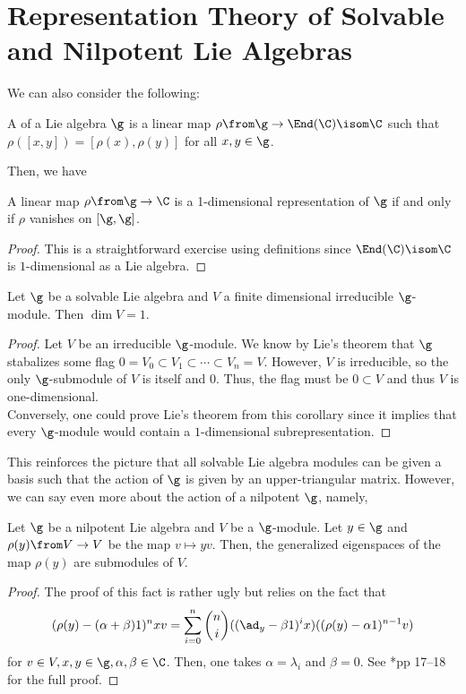 \documentclass[11pt,leqno,oneside]{amsart}
\numberwithin{thm}{section}
\begin{document}
\section{Representation Theory of Solvable and Nilpotent Lie Algebras}
We can also consider the following:
\begin{defn}
  A  of a Lie algebra \(\g\) is a
  linear map \(\rho \from \g \to \End(\C) \isom \C\) such that \(\rho([x,y]) =
  [\rho(x),\rho(y)]\) for all \(x,y \in \g\).
\end{defn}
Then, we have
\begin{lem}
  A linear map \(\rho \from \g \to \C\) is a 1-dimensional
  representation of \(\g\) if and only if \(\rho\) vanishes on \([\g,\g]\).
\end{lem}
\begin{proof}
  This is a straightforward exercise using definitions since
  \(\End(\C) \isom \C\) is \(1\)-dimensional as a Lie algebra.
\end{proof}
\begin{cor}
  Let \(\g\) be a solvable Lie algebra and \(V\) a finite dimensional
  irreducible \(\g\)-module. Then \(\dim V = 1\).
\end{cor}
\begin{proof}
  Let \(V\) be an irreducible \(\g\)-module. We know by Lie's theorem that \(\g\) stabalizes some flag \(0 = V_0
  \subset V_1 \subset \cdots \subset V_n = V\). However, \(V\) is
  irreducible, so the only \(\g\)-submodule of \(V\) is itself and
  \(0\). Thus, the flag must be \(0 \subset V\) and thus \(V\) is
  one-dimensional. \\

  Conversely, one could prove Lie's theorem from this corollary since
  it implies that every \(\g\)-module would contain a
  \(1\)-dimensional subrepresentation.
\end{proof}
This reinforces the picture that all solvable Lie algebra modules can
be given a basis such that the action of \(\g\) is given by an
upper-triangular matrix. However, we can say even more about the
action of a nilpotent \(\g\), namely,
\begin{thm}
  Let \(\g\) be a nilpotent Lie algebra and \(V\) be a
  \(\g\)-module. Let \(y \in \g\) and \(\rho(y) \from V \to V\) be the
  map \(v \mapsto yv\). Then, the generalized eigenspaces of the map
  \(\rho(y)\) are submodules of \(V\).
\end{thm}
\begin{proof}
  The proof of this fact is rather ugly but relies on the fact that \[
    (\rho(y)-(\alpha+\beta)1)^n xv = \sum_{i=0}^n \binom{n}{i} ((\ad_y
    - \beta 1)^i x)((\rho(y)-\alpha 1)^{n-1}v)
  \]
  for \(v \in V, x,y \in \g, \alpha, \beta \in \C\). Then, one takes
  \(\alpha = \lambda_i\) and \(\beta = 0\). See
  \cite{carter}*{pp 17--18} for the full proof.
\end{proof}
\end{document}
